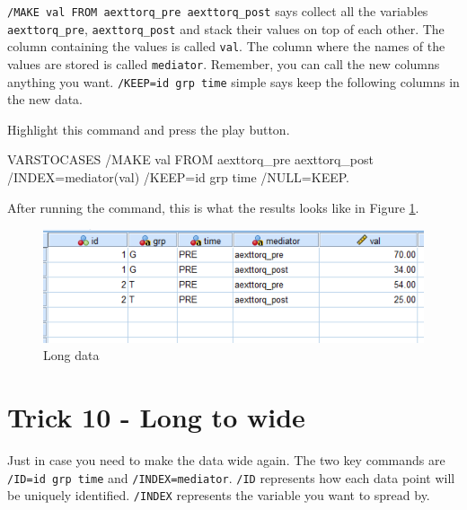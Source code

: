 \documentclass[
]{book}
\newenvironment{Shaded}{\begin{snugshade}}{\end{snugshade}}
\newcommand{\ConstantTok}[1]{\textcolor[rgb]{0.00,0.00,0.00}{#1}}
\newcommand{\FunctionTok}[1]{\textcolor[rgb]{0.00,0.00,0.00}{#1}}
\newcommand{\NormalTok}[1]{#1}
\newcommand{\OtherTok}[1]{\textcolor[rgb]{0.56,0.35,0.01}{#1}}
\newcommand{\SpecialCharTok}[1]{\textcolor[rgb]{0.00,0.00,0.00}{#1}}
\begin{document}
\texttt{/MAKE\ val\ FROM\ aexttorq\_pre\ aexttorq\_post} says collect all the variables \texttt{aexttorq\_pre}, \texttt{aexttorq\_post} and stack their values on top of each other. The column containing the values is called \texttt{val}. The column where the names of the values are stored is called \texttt{mediator}. Remember, you can call the new columns anything you want. \texttt{/KEEP=id\ grp\ time} simple says keep the following columns in the new data.

Highlight this command and press the play button.

\begin{Shaded}
\begin{Highlighting}[]
\NormalTok{VARSTOCASES}
  \SpecialCharTok{/}\NormalTok{MAKE val FROM aexttorq\_pre aexttorq\_post }
  \SpecialCharTok{/}\NormalTok{INDEX}\OtherTok{=}\FunctionTok{mediator}\NormalTok{(val) }
  \SpecialCharTok{/}\NormalTok{KEEP}\OtherTok{=}\NormalTok{id grp time}
  \SpecialCharTok{/}\ConstantTok{NULL}\OtherTok{=}\NormalTok{KEEP.}
\end{Highlighting}
\end{Shaded}

After running the command, this is what the results looks like in Figure \ref{fig:tidy}.

\begin{figure}
\includegraphics[width=1\linewidth]{images/long_data} \caption{Long data}\label{fig:tidy}
\end{figure}

\hypertarget{trick-10---long-to-wide}{%
\chapter*{Trick 10 - Long to wide}\label{trick-10---long-to-wide}}

Just in case you need to make the data wide again. The two key commands are \texttt{/ID=id\ grp\ time} and \texttt{/INDEX=mediator}. \texttt{/ID} represents how each data point will be uniquely identified. \texttt{/INDEX} represents the variable you want to spread by.
\end{document}

